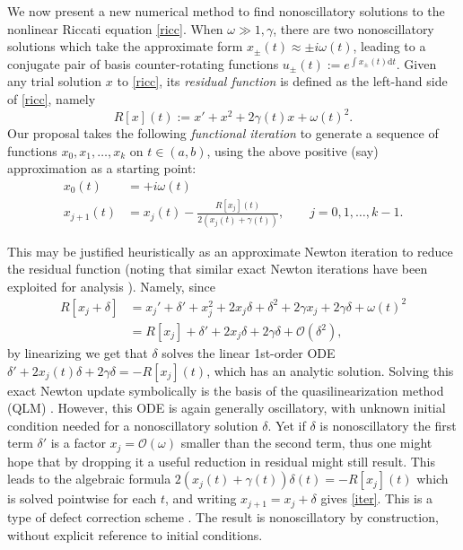 \documentclass[10pt]{article}
\newcommand{\be}{\begin{equation}}
\newcommand{\ee}{\end{equation}}
\newcommand{\ie}{{\it i.e.\ }}
\renewcommand{\d}{\mathrm{d}} %
\newcommand{\bigO}{{\mathcal O}}
\newcommand{\om}{\omega}
\newcommand{\g}{\gamma}
\newcommand{\Fruzsi}[1]{{\color{blue}#1}}
\begin{document}
We now present a new numerical method to find nonoscillatory
solutions to the nonlinear Riccati equation \cref{ricc}.
When $\om\gg 1, \g$, there are two nonoscillatory solutions
which take the approximate form
$x_{\pm}(t) \approx \pm i\om(t)$, leading to a conjugate pair of basis
counter-rotating functions $u_{\pm}(t) := e^{\int x_\pm(t) \d t}$.
Given any trial solution $x$ to \cref{ricc}, its \textit{residual
  function} is defined as the left-hand side of \cref{ricc}, namely
\be
\label{R}
R[x](t) := x' + x^2 + 2\g(t)x + \om(t)^2.
\ee
Our proposal takes the following \textit{functional iteration}
to generate a sequence of functions $x_0, x_1, \dots, x_k$
on $t\in(a,b)$,
using the above positive (say) approximation as a starting point:
\begin{align}
x_0(t) &= +i\om(t)
\label{init}
\\
    x_{j+1}(t) &= x_j(t) - \frac{R[x_j](t)}{2 \left( x_j(t) + \g(t) \right)}, \qquad j=0,1,\dots,k-1.
\label{iter}
\end{align}

This may be justified heuristically as an approximate Newton
iteration to reduce the residual function
(noting that similar exact Newton iterations have been
exploited for analysis \cite{heitman2015}).
Namely, since
\begin{align}
    R[x_j + \delta] &= x_j' + \delta' + x_j^2 + 2 x_j \delta + \delta^2 
    + 2\g x_j + 2\g\delta + \om(t)^2 \nonumber \\
    &= R[x_j] + \delta' + 2x_j\delta + 2\g\delta + \bigO(\delta^2), \nonumber
\end{align}
by linearizing we get that $\delta$ solves the linear 1st-order ODE
$\delta' + 2x_j(t) \delta + 2\g \delta  = -R[x_j](t)$,
which has an analytic solution.
Solving this exact Newton update symbolically is the basis of the quasilinearization method (QLM) \cite{bellman1970}.
However, this ODE is again generally oscillatory,
with unknown initial condition needed for a nonoscillatory solution $\delta$.
Yet if $\delta$ is nonoscillatory the first term $\delta'$ is
a factor $x_j = \bigO(\om)$ smaller than the second term, thus
one might hope that by dropping it a useful reduction in residual might
still result.
This leads to the algebraic formula $2\left(x_j(t) + \g(t)\right) \delta(t) = -R[x_j](t)$
which is solved pointwise for each $t$, and
writing $x_{j+1} = x_j + \delta$ gives \cref{iter}.
This is a type of defect correction scheme \cite{bohmer1984}.
The result is nonoscillatory by construction, without explicit reference
to initial conditions.
\end{document}
